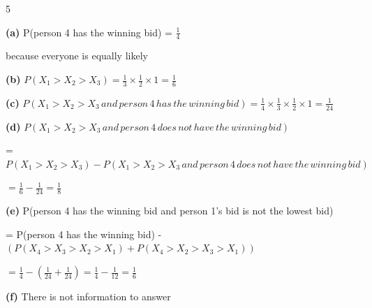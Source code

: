 \documentclass[12 pt]{article}
\begin{document}
    \begin{exercise}{5}
    \hfill

    \textbf{(a)} P(person 4 has the winning bid) = $\frac{1}{4}$

    because everyone is equally likely

    \hfill

    \textbf{(b)} $P(X_1 > X_2 > X_3) = \frac{1}{3} \times \frac{1}{2} \times 1 = \frac{1}{6}$

    \hfill

    \textbf{(c)} $P(X_1 > X_2 > X_3 \, and \, person \, 4 \, has \, the \, winning \, bid) = \frac{1}{4} \times \frac{1}{3} \times \frac{1}{2} \times 1 = \frac{1}{24}$

    \hfill

    \textbf{(d)} $P(X_1 > X_2 > X_3 \, and \, person \, 4 \, does \, not \, have \, the \, winning \, bid)$ 
    
    = $P(X_1 > X_2 > X_3) - P(X_1 > X_2 > X_3 \, and \, person \, 4 \, does \, not \, have \, the \, winning \, bid)$
    
    $= \frac{1}{6} - \frac{1}{24} = \frac{1}{8}$

    \hfill

    \textbf{(e)} P(person 4 has the winning bid and person 1's bid is not the lowest bid)

    = P(person 4 has the winning bid) - $(P(X_4 > X_3 > X_2 > X_1) + P(X_4 > X_2 > X_3 > X_1))$

    $= \frac{1}{4} - (\frac{1}{24} + \frac{1}{24}) = \frac{1}{4} - \frac{1}{12} = \frac{1}{6}$

    \hfill

    \textbf{(f)} There is not information to answer

    \hfill    
    \end{exercise}
\end{document}
